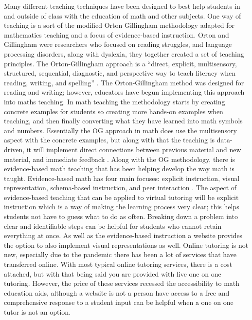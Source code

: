 \documentclass[10pt,twocolumn]{article}
\begin{document}
Many different teaching techniques have been designed to best help students in and outside of class with the education of math and other subjects. One way of teaching is a sort of the modified Orton Gillingham methodology adapted for mathematics teaching and a focus of evidence-based instruction. Orton and Gillingham were researchers who focused on reading struggles, and language processing disorders, along with dyslexia, they together created a set of teaching principles. The Orton-Gillingham approach is a “direct, explicit, multisensory, structured, sequential, diagnostic, and perspective way to teach literacy when reading, writing, and spelling” \cite{ahearn_what_2016}. The Orton-Gillingham method was designed for reading and writing; however, educators have begun implementing this approach into maths teaching. In math teaching the methodology starts by creating concrete examples for students so creating more hands-on examples when teaching, and then finally converting what they have learned into math symbols and numbers. Essentially the OG approach in math does use the multisensory aspect with the concrete examples, but along with that the teaching is data-driven, it will implement direct connections between previous material and new material, and immediate feedback \cite{noauthor_why_nodate}. Along with the OG methodology, there is evidence-based math teaching that has been helping develop the way math is taught. Evidence-based math has four main focuses: explicit instruction, visual representation, schema-based instruction, and peer interaction \cite{noauthor_evidence-based_nodate}. The aspect of evidence-based teaching that can be applied to virtual tutoring will be explicit instruction which is a way of making the learning process very clear; this helps students not have to guess what to do as often. Breaking down a problem into clear and identifiable steps can be helpful for students who cannot retain everything at once. As well as the evidence-based instruction a website provides the option to also implement visual representations as well. 
Online tutoring is not new, especially due to the pandemic there has been a lot of services that have transferred online. With most typical online tutoring services, there is a cost attached, but with that being said you are provided with live one on one tutoring. However, the price of these services recessed the accessibility to math education aids, although a website is not a person have access to a free and comprehensive response to a student input can be helpful when a one on one tutor is not an option. 
 
\end{document}
